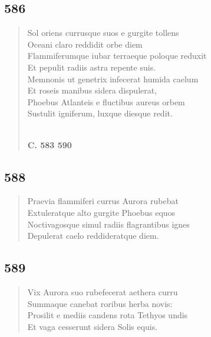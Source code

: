\documentclass[11pt, a4paper]{report}
\begin{document}
            \subsection*{586}
      \begin{verse}
      Sol oriens currusque suos e gurgite tollens \\ Oceani claro reddidit orbe diem \\ Flammiferumque iubar terraeque poloque reduxit \\ Et pepulit radiis astra repente suis. \\ Memnonis ut genetrix infecerat humida caelum \\ Et roseis manibus sidera dispulerat, \\ Phoebus Atlanteis e fluctibus aureus orbem \\ Sustulit igniferum, luxque diesque redit. \\ 
        ﻿\pagebreak 
     \marginpar{[82]} \begin{center} \textbf{C. 583 590} \end{center}
      \end{verse}
  
            \subsection*{588}
      \begin{verse}
      Praevia flammiferi currus Aurora rubebat \\ Extuleratque alto gurgite Phoebus equos \\ Noctivagosque simul radiis flagrantibus ignes \\ Depulerat caelo reddideratque diem. \\ 
      \end{verse}
  
            \subsection*{589}
      \begin{verse}
      Vix Aurora suo rubefecerat aethera curru \\ Summaque canebat roribus herba novis: \\ Prosilit e mediis candens rota Tethyos undis \\ Et vaga cesserunt sidera Solis equis. \\ 
      \end{verse}
  
\end{document}
